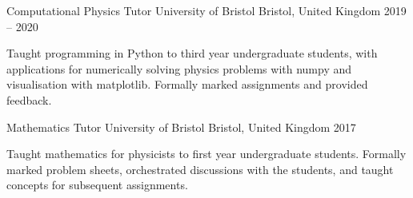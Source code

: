 
\begin{cventries}

    \cventry
      {Computational Physics Tutor} %
      {University of Bristol} %
      {Bristol, United Kingdom} %
      {2019 -- 2020} %
      {
        \begin{cvitems} %
          \item{Taught programming in Python to third year undergraduate students, with applications for numerically solving physics problems with numpy and visualisation with matplotlib. Formally marked assignments and provided feedback.}
        \end{cvitems}
      }

    \cventry
      {Mathematics Tutor} %
      {University of Bristol} %
      {Bristol, United Kingdom} %
      {2017} %
      {
        \begin{cvitems} %
          \item{Taught mathematics for physicists to first year undergraduate students. Formally marked problem sheets, orchestrated discussions with the students, and taught concepts for subsequent assignments.}
        \end{cvitems}
      }

\end{cventries}
